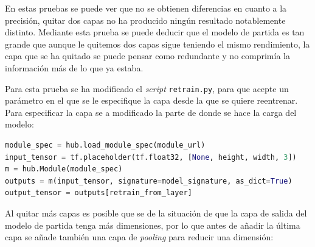 \documentclass[12pt,a4paper]{article}
\begin{document}
\begin{table}[H]
\centering
{}
\caption{Resultados quitar 2 capas.}
\end{table}

En estas pruebas se puede ver que no se obtienen diferencias en cuanto a la precisión, quitar dos capas no ha producido ningún resultado notablemente distinto. Mediante esta prueba se puede deducir que el modelo de partida es tan grande que aunque le quitemos dos capas sigue teniendo el mismo rendimiento, la capa que se ha quitado se puede pensar como redundante y no comprimía la información más de lo que ya estaba.
\bigskip

Para esta prueba se ha modificado el \textit{script} \texttt{retrain.py}, para que acepte un parámetro en el que se le especifique la capa desde la que se quiere reentrenar. Para especificar la capa se a modificado la parte de donde se hace la carga del modelo:

\begin{lstlisting}[language=Python]
module_spec = hub.load_module_spec(module_url)
input_tensor = tf.placeholder(tf.float32, [None, height, width, 3])
m = hub.Module(module_spec)
outputs = m(input_tensor, signature=model_signature, as_dict=True)
output_tensor = outputs[retrain_from_layer]
\end{lstlisting}

Al quitar más capas es posible que se de la situación de que la capa de salida del modelo de partida tenga más dimensiones, por lo que antes de añadir la última capa se añade también una capa de \textit{pooling} para reducir una dimensión:
\end{document}
